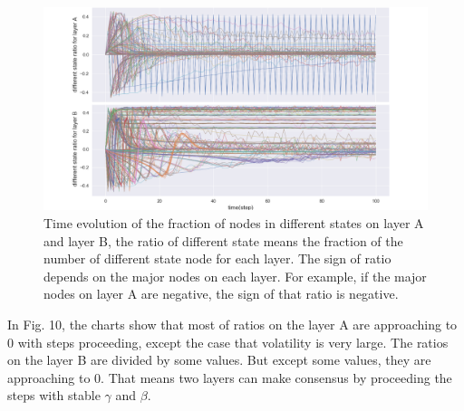 \documentclass[english]{cccconf}
\begin{document}
\begin{figure}[!htb]
  \centering
  \includegraphics[width=\hsize]{FIG10.png}
  \caption{Time evolution of the fraction of nodes in different states on layer A and layer B, the ratio of different state means the fraction of the number of different state node for each layer. The sign of ratio depends on the major nodes on each layer. For example, if the major nodes on layer A are negative, the sign of that ratio is negative.}
  \label{Fig10}
\end{figure}
In Fig. 10, the charts show that most of ratios on the layer A are approaching to 0 with steps proceeding, except the case that volatility is very large. The ratios on the layer B are divided by some values. But except some values, they are approaching to 0. That means two layers can make consensus by proceeding the steps with stable $\gamma$ and $\beta$.
\end{document}

